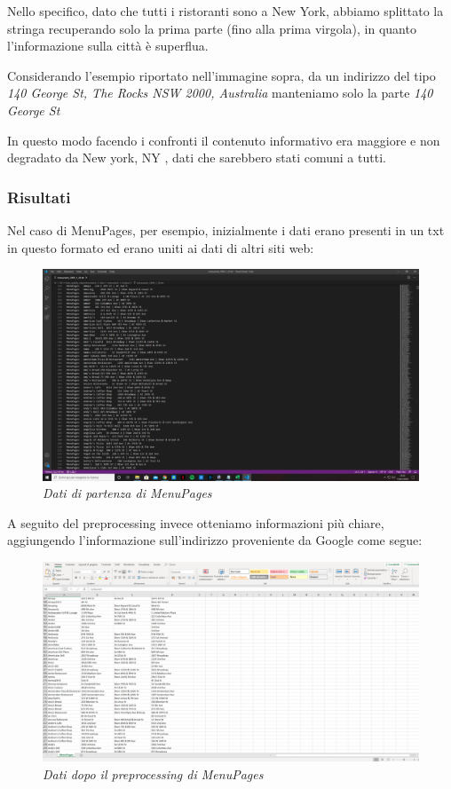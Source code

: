 \documentclass[a4paper,12pt]{article}
\begin{document}
\noindent Nello specifico,  dato che tutti i ristoranti sono a New York, abbiamo splittato la stringa recuperando solo la prima parte (fino alla prima virgola), in quanto l'informazione sulla città è superflua. 
 
Considerando l'esempio riportato nell'immagine sopra, da un indirizzo del tipo \textit{140 George St, The Rocks NSW 2000, Australia} manteniamo solo la parte \textit{140 George St}

\noindent In questo modo facendo i confronti il contenuto informativo era maggiore e non degradato da New york, NY , dati che sarebbero stati comuni a tutti.

\subsubsection{Risultati}
Nel caso di MenuPages, per esempio, inizialmente i dati erano presenti in un txt in questo formato ed erano uniti ai dati di altri siti web:\\
\begin{figure}[H]
\centering
\includegraphics[width=0.9\linewidth]{img/original.png}
\caption{\textit{Dati di partenza di MenuPages}}
\end{figure}

\noindent A seguito del preprocessing invece otteniamo informazioni più chiare, aggiungendo l'informazione sull'indirizzo proveniente da Google come segue:\\

\begin{figure}[H]
\centering
\includegraphics[width=0.9\linewidth]{img/new.png}
\caption{\textit{Dati dopo il preprocessing di MenuPages}}
\end{figure}
\end{document}
